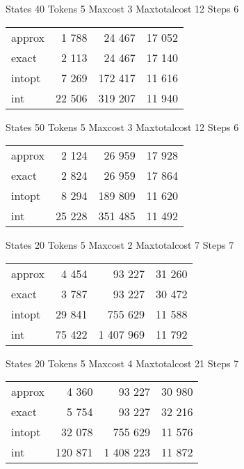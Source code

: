 \documentclass[a4paper,11pt]{article}
\begin{document}
\begin{table}
States 40 Tokens 5 Maxcost 3 Maxtotalcost 12 Steps 6 \\
\begin{tabular}{l r r r}
approx & 1 788 & 24 467 & 17 052 \\
exact & 2 113 & 24 467 & 17 140 \\
intopt & 7 269 & 172 417 & 11 616 \\
int & 22 506 & 319 207 & 11 940 \\
\end{tabular}
\end{table}

\begin{table}
States 50 Tokens 5 Maxcost 3 Maxtotalcost 12 Steps 6 \\
\begin{tabular}{l r r r}
approx & 2 124 & 26 959 & 17 928 \\
exact & 2 824 & 26 959 & 17 864 \\
intopt & 8 294 & 189 809 & 11 620 \\
int & 25 228 & 351 485 & 11 492 \\
\end{tabular}
\end{table}

\begin{table}
States 20 Tokens 5 Maxcost 2 Maxtotalcost 7 Steps 7 \\
\begin{tabular}{l r r r}
approx & 4 454 & 93 227 & 31 260 \\
exact & 3 787 & 93 227 & 30 472 \\
intopt & 29 841 & 755 629 & 11 588 \\
int & 75 422 & 1 407 969 & 11 792 \\
\end{tabular}
\end{table}

\begin{table}
States 20 Tokens 5 Maxcost 4 Maxtotalcost 21 Steps 7 \\
\begin{tabular}{l r r r}
approx & 4 360 & 93 227 & 30 980 \\
exact & 5 754 & 93 227 & 32 216 \\
intopt & 32 078 & 755 629 & 11 576 \\
int & 120 871 & 1 408 223 & 11 872 \\
\end{tabular}
\end{table}
\end{document}
